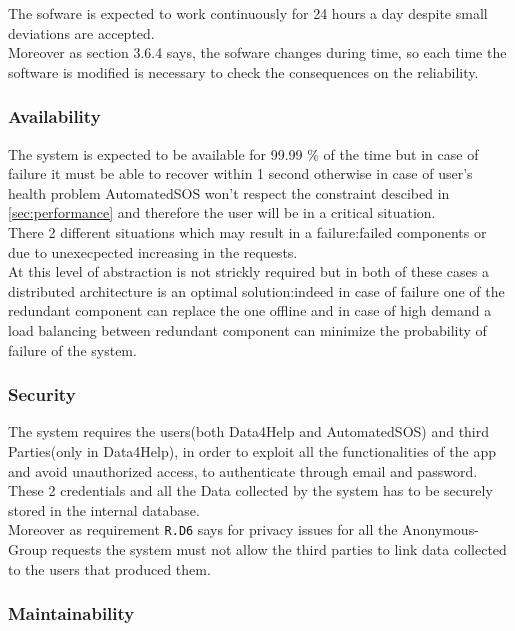       The sofware is expected to work continuously for 24 hours a day despite small deviations are accepted. \\
      Moreover as section 3.6.4 says, the sofware changes during time, so each time the software is modified is necessary to check the consequences on the reliability.

    \subsubsection{Availability}

      The system is expected to be available for 99.99 \% of the time but in case of failure it must be able to recover within 1 second otherwise in case of user's health problem AutomatedSOS won't respect the constraint descibed in \ref{sec:performance} and therefore the user will be in a critical situation.\\ There 2 different situations which may result in a failure:failed components or due to unexecpected increasing in the requests. \\At this level of abstraction is not strickly required but in both of these cases a distributed architecture is an optimal solution:indeed in case of failure one of the redundant component can replace the one offline and in case of high demand a load balancing between redundant component can minimize the probability of failure of the system.

    \subsubsection{Security}

      The system requires the users(both Data4Help and AutomatedSOS) and third Parties(only in Data4Help), in order to exploit all the functionalities of the app and avoid unauthorized access, to authenticate through email and password.\\ These 2 credentials and all the Data collected by the system has to be securely stored in the internal database.\\ Moreover as  requirement \texttt{R.D6} says for privacy issues for all the Anonymous-Group requests the system must not allow the third parties to link data collected to the users that produced them.

    \subsubsection{Maintainability}

